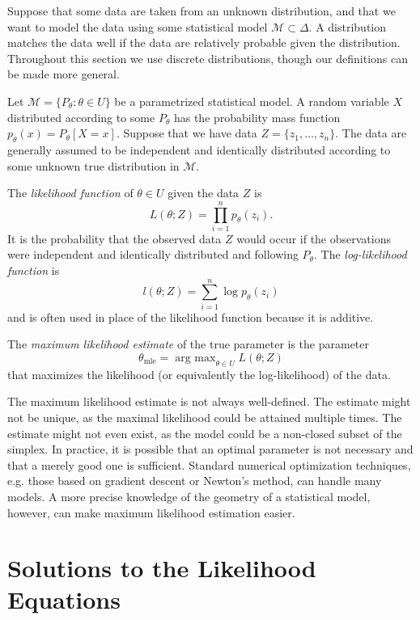 \documentclass[cclicense]{hmcthesis}
\newcommand*{\Mod}{\mathcal{M}}
\newcommand*{\mle}{\theta_{\text{mle}}}
\DeclareMathOperator*{\argmax}{arg\ max}
\numberwithin{equation}{chapter}
\numberwithin{thmcounter}{chapter}
\begin{document}
    Suppose that some data are taken from an unknown distribution, and that we
    want to model the data using some statistical model $\Mod \subset \Delta$.
    A distribution matches the data well if the data are relatively probable
    given the distribution.  Throughout this section we use discrete
    distributions, though our definitions can be made more general.

    Let $\Mod = \{P_\theta : \theta \in U\}$ be a parametrized statistical
    model. A random variable $X$ distributed according to some $P_\theta$ has
    the probability mass function $p_\theta(x) = P_\theta[X = x]$.  Suppose that
    we have data $Z = \{z_1, \ldots, z_n\}$.  The data are generally assumed to
    be independent and identically distributed according to some unknown true
    distribution in $\Mod$.
    
    \begin{definition}
    The \emph{likelihood function} of $\theta \in U$ given the data $Z$ is
    \[
        L(\theta; Z) = \prod_{i=1}^n p_\theta(z_i).
    \]
    It is the probability that the observed data $Z$ would occur if the
    observations were independent and identically distributed and following
    $P_\theta$.  The \emph{log-likelihood function} is
    \[
        l(\theta; Z) = \sum_{i=1}^n \log p_\theta(z_i)
    \]
    and is often used in place of the likelihood function because it is additive.
    \end{definition}
    \begin{definition}
    The \emph{maximum likelihood estimate} of the true parameter is the
    parameter 
    \[
        \mle = \argmax_{\theta \in U} L(\theta; Z)
    \]
    that maximizes the likelihood (or equivalently the log-likelihood) of the
    data.
    \end{definition}

    The maximum likelihood estimate is not always well-defined.  The estimate
    might not be unique, as the maximal likelihood could be attained multiple
    times.  The estimate  might not even exist, as the model could be a
    non-closed subset of the simplex.  In practice, it is possible that an
    optimal parameter is not necessary and that a merely good one is sufficient.
    Standard numerical optimization techniques, e.g. those based on gradient
    descent or Newton's method, can handle many models.  A more precise
    knowledge of the geometry of a statistical model, however, can make maximum
    likelihood estimation easier.

\section{Solutions to the Likelihood Equations}
\end{document}
